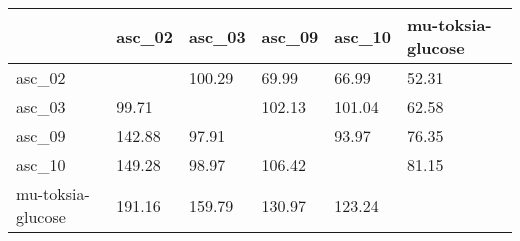 \begin{tabular}{llllll}
\toprule
{} &  asc\_02 &  asc\_03 &  asc\_09 &  asc\_10 & mu-toksia-glucose \\
\midrule
asc\_02            &         &  100.29 &   69.99 &   66.99 &             52.31 \\
asc\_03            &   99.71 &         &  102.13 &  101.04 &             62.58 \\
asc\_09            &  142.88 &   97.91 &         &   93.97 &             76.35 \\
asc\_10            &  149.28 &   98.97 &  106.42 &         &             81.15 \\
mu-toksia-glucose &  191.16 &  159.79 &  130.97 &  123.24 &                   \\
\bottomrule
\end{tabular}

